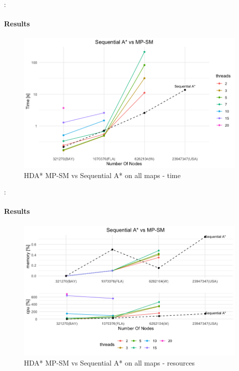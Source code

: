 \documentclass[12pt]{beamer}
\begin{document}
	\begin{frame}{\secname : \subsecname}
		\framesubtitle{Results}
		\begin{figure}[ht!]
			\centering
			\includegraphics[width=0.8\linewidth]{hda/seq_mpsm_time.png}
			\caption{HDA* MP-SM vs Sequential A* on all maps - time}
		\end{figure}
	\end{frame}
	\begin{frame}{\secname : \subsecname}
		\framesubtitle{Results}
		\begin{figure}[ht!]
			\centering
			\includegraphics[width=0.8\linewidth]{hda/seq_mpsm_cpumem.png}
			\caption{HDA* MP-SM vs Sequential A* on all maps - resources}
		\end{figure}
	\end{frame}
\end{document}
